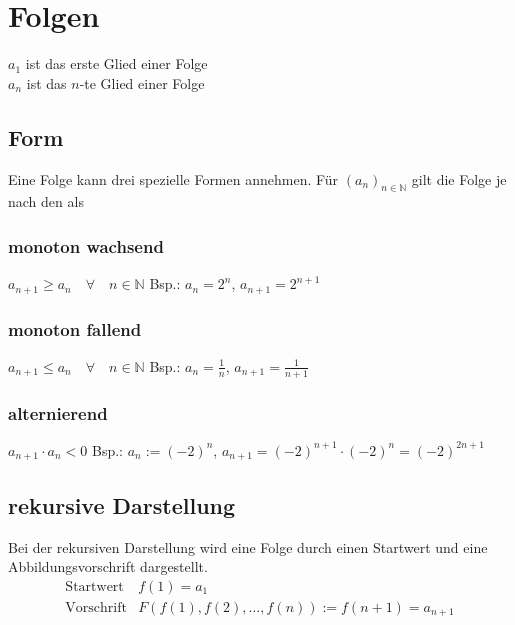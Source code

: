 




\section{Folgen}
$a_1$ ist das erste Glied einer Folge\\
$a_n$ ist das $n$-te Glied einer Folge

\subsection{Form}
Eine Folge kann drei spezielle Formen annehmen. Für $(a_n)_{n \in \mathbb{N}}$ gilt die Folge je
nach den als
\subsubsection*{monoton wachsend}
$ \boxed{ a_{n+1} \geq a_n \quad \forall \quad n \in \mathbb{N} } $ Bsp.: $a_n = 2^n$, $a_{n+1} = 2^{n+1}$
\subsubsection*{monoton fallend}
$ \boxed{ a_{n+1} \leq a_n \quad \forall \quad n \in \mathbb{N} } $ Bsp.: $a_n = \frac{1}{n}$, $a_{n+1} = \frac{1}{n+1}$
\subsubsection*{alternierend}
$ \boxed{ a_{n+1} \cdot a_n < 0 } $ Bsp.: $a_n := (-2)^n$, $a_{n+1} = (-2)^{n+1} \cdot (-2)^n = (-2)^{2n+1}$

\subsection{rekursive Darstellung}
Bei der rekursiven Darstellung wird eine Folge durch einen Startwert und eine Abbildungsvorschrift dargestellt. \\
\[ \boxed{ \begin{matrix}
\text{Startwert} & f(1) = a_1 \\
\text{Vorschrift} & F(f(1), f(2), \ldots, f(n)) := f(n + 1) = a_{n + 1}
\end{matrix}} \]

